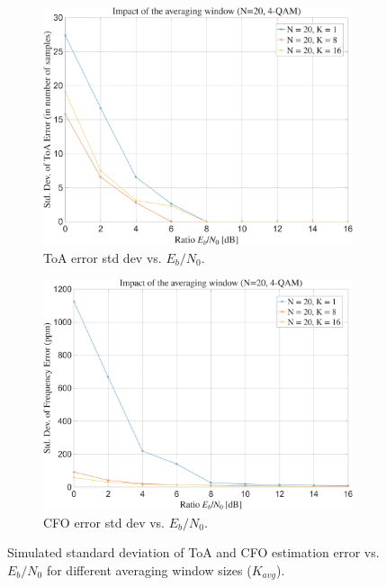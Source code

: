 \documentclass[11pt]{article}
\begin{document}
	\begin{figure}[H]
		\centering
		\begin{subfigure}[b]{0.48\textwidth}
			\centering
			\includegraphics[width=\linewidth]{Images/frame_sync_K_avg.png} 
			\caption{ToA error std dev vs. $E_b/N_0$.}
			\label{fig:frame_sync_K_avg_style_change}
		\end{subfigure}
		\hfill
		\begin{subfigure}[b]{0.48\textwidth}
			\centering
			\includegraphics[width=\linewidth]{Images/cfo_est_K_avg.png} 
			\caption{CFO error std dev vs. $E_b/N_0$.}
			\label{fig:cfo_est_K_avg_style_change}
		\end{subfigure}
		\caption{Simulated standard deviation of ToA and CFO estimation error vs. $E_b/N_0$ for different averaging window sizes ($K_{avg}$).}
		\label{fig:acquisition_vs_K_avg}
	\end{figure}
	
\end{document}
